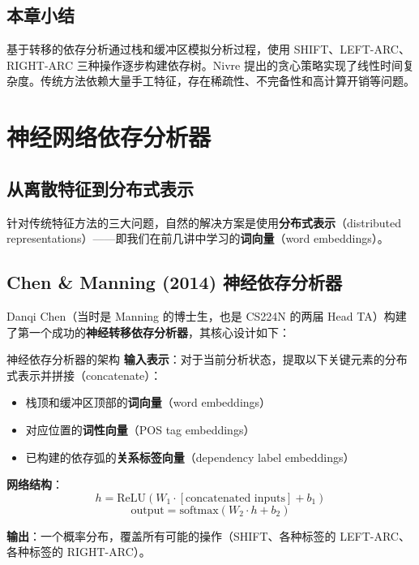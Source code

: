 \documentclass[a4paper]{article}
\begin{document}
\subsection{本章小结}

基于转移的依存分析通过栈和缓冲区模拟分析过程，使用 SHIFT、LEFT-ARC、RIGHT-ARC 三种操作逐步构建依存树。Nivre 提出的贪心策略实现了线性时间复杂度。传统方法依赖大量手工特征，存在稀疏性、不完备性和高计算开销等问题。


\section{神经网络依存分析器}

\subsection{从离散特征到分布式表示}





针对传统特征方法的三大问题，自然的解决方案是使用\textbf{分布式表示}（distributed representations）——即我们在前几讲中学习的\textbf{词向量}（word embeddings）。

\subsection{Chen \& Manning (2014) 神经依存分析器}





Danqi Chen（当时是 Manning 的博士生，也是 CS224N 的两届 Head TA）构建了第一个成功的\textbf{神经转移依存分析器}，其核心设计如下：

\begin{importantbox}{神经依存分析器的架构}
\textbf{输入表示}：对于当前分析状态，提取以下关键元素的分布式表示并拼接（concatenate）：
\begin{itemize}
    \item 栈顶和缓冲区顶部的\textbf{词向量}（word embeddings）
    \item 对应位置的\textbf{词性向量}（POS tag embeddings）
    \item 已构建的依存弧的\textbf{关系标签向量}（dependency label embeddings）
\end{itemize}

\textbf{网络结构}：
$$h = \text{ReLU}(W_1 \cdot [\text{concatenated inputs}] + b_1)$$
$$\text{output} = \text{softmax}(W_2 \cdot h + b_2)$$

\textbf{输出}：一个概率分布，覆盖所有可能的操作（SHIFT、各种标签的 LEFT-ARC、各种标签的 RIGHT-ARC）。
\end{importantbox}
\end{document}
